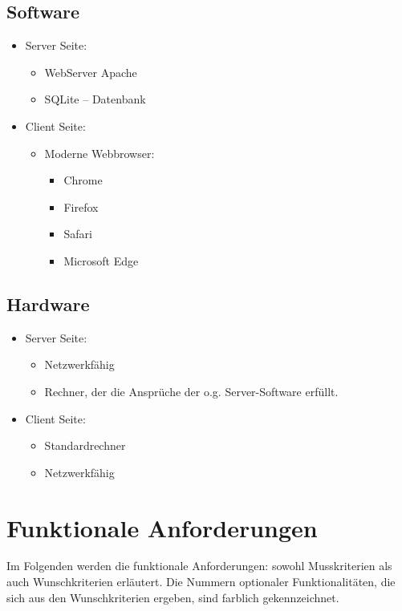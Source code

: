 \documentclass[parskip=full,11pt]{scrartcl}
\begin{document}
\subsection{Software}
\begin{itemize}[itemsep=0pt]
\item Server Seite:
	\begin{itemize}
	\item WebServer Apache 
	\item SQLite – Datenbank
	\end{itemize}
\item Client Seite:
	\begin{itemize}
	\item Moderne Webbrowser:
		\begin{itemize}
		\item Chrome
		\item Firefox
		\item Safari
		\item Microsoft Edge
		\end{itemize}
	
	\end{itemize}
\end{itemize}

\subsection{Hardware}
\begin{itemize}[itemsep=0pt]

	\item Server Seite:
	\begin{itemize}
	\item Netzwerkfähig
	\item Rechner, der die Ansprüche der o.g. Server-Software erfüllt.
	\end{itemize}
	\item Client Seite:
	\begin{itemize}
	\item Standardrechner
	\item Netzwerkfähig
	\end{itemize}
\end{itemize}
\newpage


\section{Funktionale Anforderungen}
Im Folgenden werden die funktionale Anforderungen: sowohl Musskriterien als auch Wunschkriterien erläutert. Die Nummern optionaler Funktionalitäten, die sich aus den Wunschkriterien ergeben, sind \colorbox{shadecolor}{farblich gekennzeichnet}.
\end{document}
